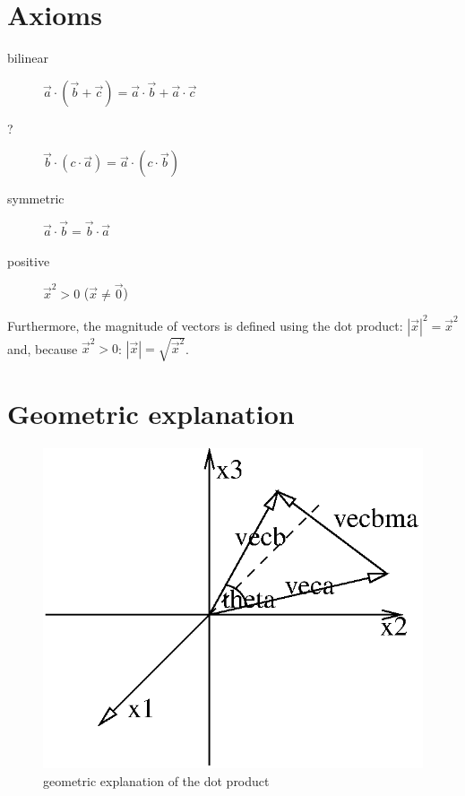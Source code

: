 \documentclass[math,plainoldenumerate,afour]{homework}
\begin{document}
\pagestyle{plain}

\section{Axioms}

\begin{description}
\item[bilinear]
  $\vec{a}\cdot(\vec{b}+\vec{c})=\vec{a}\cdot\vec{b}+\vec{a}\cdot\vec{c}$
\item[?]
  $\vec{b}\cdot(c\cdot\vec{a})=\vec{a}\cdot(c\cdot\vec{b})$
\item[symmetric]
  $\vec{a}\cdot\vec{b}=\vec{b}\cdot\vec{a}$
\item[positive]
  $\vec{x}^2>0$ ($\vec{x}\not=\vec{0}$)
\end{description}

Furthermore, the magnitude of vectors is defined using the dot product:
$|\vec{x}|^2=\vec{x}^2$ and, because $\vec{x}^2>0$:
$|\vec{x}|=\sqrt{\vec{x}^2}$.

\section{Geometric explanation}
\label{sec:dotproductgeometry}

\begin{figure}[ht]
  \Large
  \begin{center}
    \includegraphics*{dotproduct.eps}
  \end{center}
  \caption{geometric explanation of the dot product}
  \label{fig:dotproductgeometry}
\end{figure}
\end{document}
